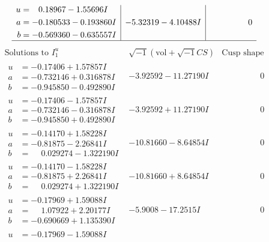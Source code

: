 \documentclass[1p]{elsarticle_modified}
\theoremstyle{definition}
\newcommand{\I}{\sqrt{-1}}
\begin{document}
$$\begin{array}{c|c|c}
\begin{aligned}
u &= \phantom{-}0.18967 - 1.55696 I \\
a &= -0.180533 - 0.193860 I \\
b &= -0.569360 - 0.635557 I\end{aligned}
 & -5.32319 - 4.10488 I & \phantom{-0.000000 } 0\\
 \hline 
 \end{array}$$\newpage$$\begin{array}{c|c|c}  
\text{Solutions to }I^u_{1}& \I (\text{vol} + \sqrt{-1}CS) & \text{Cusp shape}\\
 \hline 
\begin{aligned}
u &= -0.17406 + 1.57857 I \\
a &= -0.732146 + 0.316878 I \\
b &= -0.945850 - 0.492890 I\end{aligned}
 & -3.92592 - 11.27190 I & \phantom{-0.000000 } 0 \\ \hline\begin{aligned}
u &= -0.17406 - 1.57857 I \\
a &= -0.732146 - 0.316878 I \\
b &= -0.945850 + 0.492890 I\end{aligned}
 & -3.92592 + 11.27190 I & \phantom{-0.000000 } 0 \\ \hline\begin{aligned}
u &= -0.14170 + 1.58228 I \\
a &= -0.81875 - 2.26841 I \\
b &= \phantom{-}0.029274 - 1.322190 I\end{aligned}
 & -10.81660 - 8.64854 I & \phantom{-0.000000 } 0 \\ \hline\begin{aligned}
u &= -0.14170 - 1.58228 I \\
a &= -0.81875 + 2.26841 I \\
b &= \phantom{-}0.029274 + 1.322190 I\end{aligned}
 & -10.81660 + 8.64854 I & \phantom{-0.000000 } 0 \\ \hline\begin{aligned}
u &= -0.17969 + 1.59088 I \\
a &= \phantom{-}1.07922 + 2.20177 I \\
b &= -0.690669 + 1.135390 I\end{aligned}
 & -5.9008 - 17.2515 I & \phantom{-0.000000 } 0 \\ \hline\begin{aligned}
u &= -0.17969 - 1.59088 I \\

\end{aligned}
\end{array}$$
\end{document}
